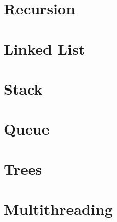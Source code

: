 \documentclass{article}
\begin{document}
\section{Recursion}

\section{Linked List}

\section{Stack}

\section{Queue}

\section{Trees}

\section{Multithreading}
\end{document}
